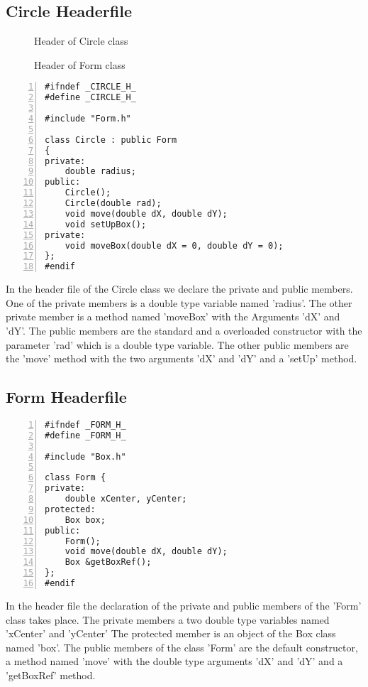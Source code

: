 \documentclass{article}
\begin{document}
\subsection{Circle Headerfile}
\begin{figure}
\scriptsize{\caption{Header of Circle class}}
\scriptsize{\caption{Header of Form class}}
\end{figure}
\begin{lstlisting}[basicstyle=\footnotesize\ttfamily, numbers=left, stepnumber=1, numberstyle = \normalsize]
#ifndef _CIRCLE_H_
#define _CIRCLE_H_

#include "Form.h"

class Circle : public Form
{
private: 
	double radius; 
public:
	Circle();
	Circle(double rad);
	void move(double dX, double dY);
	void setUpBox();
private:
	void moveBox(double dX = 0, double dY = 0);
};
#endif
\end{lstlisting}
\normalsize{In the header file of the Circle class we declare the private and public members. One of the private members is a double type variable named 'radius'. The other private member is a method named 'moveBox' with the Arguments 'dX' and 'dY'. The public members are the standard and a overloaded constructor with the parameter 'rad' which is a double type variable. The other public members are the 'move' method with the two arguments 'dX' and 'dY' and a 'setUp' method.}

\subsection{Form Headerfile}
\begin{lstlisting}[basicstyle=\footnotesize\ttfamily, numbers=left, stepnumber=1, numberstyle = \normalsize]
#ifndef _FORM_H_
#define _FORM_H_

#include "Box.h"

class Form {
private:
	double xCenter, yCenter;  
protected:	
	Box box; 	
public:
	Form();
	void move(double dX, double dY);	
	Box &getBoxRef();
};
#endif
\end{lstlisting}
\normalsize{In the header file the declaration of the private and public members of the 'Form' class takes place. The private members a two double type variables named 'xCenter' and 'yCenter' The protected member is an object of the Box class named 'box'. The public members of the class 'Form' are the default constructor, a method named 'move' with the double type arguments 'dX' and 'dY' and a 'getBoxRef' method.
}
\newpage
\end{document}
